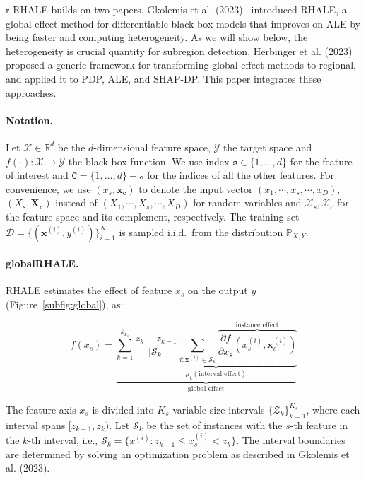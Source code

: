 \documentclass[sigconf, nonacm]{acmart}
\newcommand{\xb}{\mathbf{x}}
\newcommand{\xc}{\mathbf{x_c}}
\newcommand{\Xc}{\mathbf{X_c}}
\newcommand{\xci}{\mathbf{x}^{(i)}_c}
\begin{document}
r-RHALE builds on two papers. Gkolemis et al. (2023)~\citep{gkolemis2023rhale} introduced RHALE, a global effect method for differentiable black-box models that improves on ALE by being faster and computing heterogeneity. As we will show below, the heterogeneity is crucial quantity for subregion detection. Herbinger et al. (2023)~\citep{herbinger2023decomposing} proposed a generic framework for transforming global effect methods to regional, and applied it to PDP\cite{friedman_predictive_2008}, ALE\cite{apley_visualizing_2020}, and SHAP-DP\cite{lundberg2017unified}. This paper integrates these approaches.

\paragraph{Notation.}

Let \(\mathcal{X} \in \mathbb{R}^d\) be the \(d\)-dimensional feature space, \(\mathcal{Y}\) the target space and
\(f(\cdot) : \mathcal{X} \rightarrow \mathcal{Y}\) the black-box function.
We use index \(\mathtt{s} \in \{1, \ldots, d\}\) for the feature of interest and \(\mathtt{C} = \{1, \ldots, d\} - s\) for the indices of all the other features.
For convenience, we use \((x_s, \xc)\) to denote the input vector \((x_1, \cdots , x_s, \cdots, x_D)\),
\((X_s, \Xc)\) instead of \((X_1, \cdots , X_s, \cdots, X_D)\) for random variables and
$\mathcal{X}_s, \mathcal{X}_{c}$ for the feature space and its complement, respectively.
The training set \(\mathcal{D} = \{(\xb^{(i)}, y^{(i)})\}_{i=1}^N\) is sampled
i.i.d.\ from the distribution \(\mathbb{P}_{X,Y}\).

\paragraph{globalRHALE.}

RHALE estimates the effect of feature $x_s$ on the output $y$ (Figure~\ref{subfig:global}), as:

\begin{equation}
  \label{eq:rhale-approximation}
f(x_s) = \underbrace{\sum_{k=1}^{k_{x_s}} \underbrace{\frac{z_k - z_{k-1}}{ \left | \mathcal{S}_k \right |} \sum_{i: \xb^{(i)} \in \mathcal{S}_k} \overbrace{\frac{\partial f}{\partial x_s} (x_s^{(i)}, \xci)}^{\text{instance effect}}}_{\mu_k (\text{interval effect})}}_{\text{global effect}}
\end{equation}

\noindent
The feature axis $x_s$ is divided into $K_s$ variable-size intervals $\{\mathcal{Z}_k\}_{k=1}^{K_s}$, where each interval spans $[z_{k-1}, z_k)$. Let $\mathcal{S}_k$ be the set of instances with the $s$-th feature in the $k$-th interval, i.e., $\mathcal{S}_k = \{ x^{(i)} : z_{k-1} \leq x^{(i)}_s < z_k \}$. The interval boundaries are determined by solving an optimization problem as described in Gkolemis et al. (2023).
\end{document}
